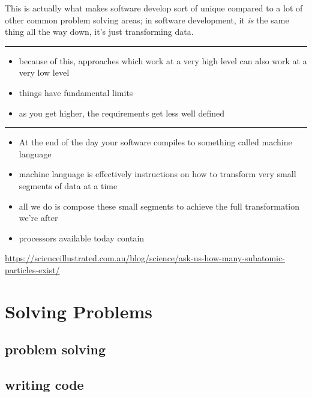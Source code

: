 \documentclass[]{book}
\providecommand{\tightlist}{%
  \setlength{\itemsep}{0pt}\setlength{\parskip}{0pt}}
\begin{document}
This is actually what makes software develop sort of unique compared to
a lot of other common problem solving areas; in software development, it
\emph{is} the same thing all the way down, it's just transforming data.

\begin{center}\rule{0.5\linewidth}{0.5pt}\end{center}

\begin{itemize}
\tightlist
\item
  because of this, approaches which work at a very high level can also
  work at a very low level
\item
  things have fundamental limits
\item
  as you get higher, the requirements get less well defined
\end{itemize}

\begin{center}\rule{0.5\linewidth}{0.5pt}\end{center}

\begin{itemize}
\tightlist
\item
  At the end of the day your software compiles to something called
  machine language
\item
  machine language is effectively instructions on how to transform very
  small segments of data at a time
\item
  all we do is compose these small segments to achieve the full
  transformation we're after
\item
  processors available today contain
\end{itemize}

\url{https://scienceillustrated.com.au/blog/science/ask-us-how-many-subatomic-particles-exist/}

\chapter{Solving Problems}\label{solving-problems}

\section{problem solving}\label{problem-solving}

\section{writing code}\label{writing-code}
\end{document}
